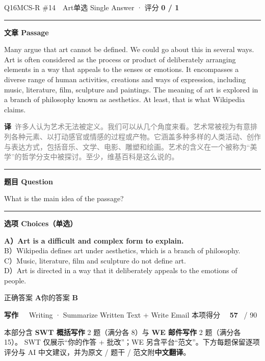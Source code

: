 \documentclass[11pt]{article}
\newcommand{\ptesub}[1]{%
  \par\needspace{2\baselineskip}\smallskip
  {\color{cAccent}\rule[-0.2ex]{3pt}{1.05em}}\hspace{6pt}%
  {\bfseries\color{cHead}#1}\par\nopagebreak\smallskip}
\newcommand{\ptesection}[3]{%
  \addcontentsline{toc}{section}{#1}%
  \needspace{6\baselineskip}
  \begin{tcolorbox}[enhanced, colback=cAccent, colframe=cAccent, sharp corners,
     left=14pt, right=14pt, top=10pt, bottom=10pt, boxrule=0pt]
    {\fontsize{20}{24}\selectfont\bfseries\color{white} #1\ \ }%
    {\large\color{white!85} #2}\hfill
    {\large\color{white}本项得分\ \ }{\fontsize{22}{24}\selectfont\bfseries\color{white} #3}%
    \ {\color{white!85}/ 90}
  \end{tcolorbox}}
\newcommand{\zh}[1]{{\footnotesize\textcolor{cNote}{\textbf{译}}\ \textcolor{gray}{#1}}}
\begin{document}
\begin{qblock}{Q16\quad MCS-R \#14\ \ Art}{单选 Single Answer · 评分 \textcolor{cAccent}{\bfseries 0 / 1}}
\ptesub{文章 Passage}
\begin{promptbox}
Many argue that art cannot be defined. We could go about this in several ways. Art is often considered as the process or product of deliberately arranging elements in a way that appeals to the senses or emotions. It encompasses a diverse range of human activities, creations and ways of expression, including music, literature, film, sculpture and paintings. The meaning of art is explored in a branch of philosophy known as aesthetics. At least, that is what Wikipedia claims.
\end{promptbox}
\zh{许多人认为艺术无法被定义。我们可以从几个角度来看。艺术常被视为有意排列各种元素、以打动感官或情感的过程或产物。它涵盖多种多样的人类活动、创作与表达方式，包括音乐、文学、电影、雕塑和绘画。艺术的含义在一个被称为“美学”的哲学分支中被探讨。至少，维基百科是这么说的。}
\ptesub{题目 Question}
\begin{notebox}\small What is the main idea of the passage?\end{notebox}
\ptesub{选项 Choices（单选）}
{\small
{\color{cFix}\textbf{A）Art is a difficult and complex form to explain.}}\\
B）Wikipedia defines art under aesthetics, which is a branch of philosophy.\\
C）Music, literature, film and sculpture do not define art.\\
D）Art is directed in a way that it deliberately appeals to the emotions of people.}
\smallskip\par
{\small 正确答案 \textcolor{cFix}{\bfseries A}\qquad 你的答案 {\color{cWrong}\bfseries B}}
\end{qblock}

\clearpage
\ptesection{写作}{Writing · Summarize Written Text + Write Email}{57}

\vspace{1mm}
{\small\color{gray} 本部分含 \textbf{SWT 概括写作} 2 题（满分各 8）与 \textbf{WE 邮件写作} 2 题（满分各 15）。
SWT 仅展示“你的作答 + 批改”；WE 另含平台“范文”。下方每题保留逐项评分与 AI 中文建议，并为原文 / 题干 / 范文附\textbf{中文翻译}。}
\vspace{2mm}
\end{document}
